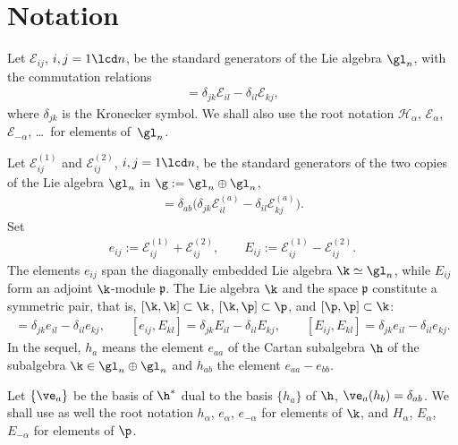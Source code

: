 \section{Notation}\label{section-notation}

Let ${\mathcal{E}}_{ij}$, $i,j=1\lcd n$, be the standard generators of the Lie algebra $\gl_n$, with the commutation relations
\begin{gather*}
[{\mathcal{E}}_{ij},{\mathcal{E}}_{kl}]=\delta_{jk}{\mathcal{E}}_{il}-\delta_{il}{\mathcal{E}}_{kj} ,
\end{gather*}
where $\delta_{jk}$ is the Kronecker symbol. We shall also use the root notation ${\mathcal{H}}_\alpha$, ${\mathcal{E}}_{\alpha}$, ${\mathcal{E}}_{-\alpha}$, \dots\ for elements of~$\gl_n$.


Let ${\mathcal{E}}_{ij}^{(1)}$ and ${\mathcal{E}}_{ij}^{(2)}$, $i,j=1\lcd n$, be the standard generators of the two copies of the Lie algebra $\gl_n$ in $\g:=\gl_n\oplus\gl_n$,
\begin{gather*}
[{\mathcal{E}}_{ij}^{(a)},{\mathcal{E}}_{kl}^{(b)}]=\delta_{ab}\big(\delta_{jk}{\mathcal{E}}_{il}^{(a)}-\delta_{il}{\mathcal{E}}_{kj}^{(a)}\big) .\end{gather*}
Set
\begin{gather*}
 e_{ij}:={\mathcal{E}}_{ij}^{(1)}+{\mathcal{E}}_{ij}^{(2)} ,\qquad E_{ij}:={\mathcal{E}}_{ij}^{(1)}-{\mathcal{E}}_{ij}^{(2)}
 .
 \end{gather*}
The elements $e_{ij}$ span the diagonally embedded Lie algebra $\k\simeq\gl_n$, while $E_{ij}$ form an adjoint $\k$-module $\mathfrak{p}$. The
Lie algebra $\k$ and the space $\mathfrak{p}$ constitute a symmetric pair, that is, $[\k,\k]\subset \k$, $[\k,\p]\subset \p$, and $[\p,\p]\subset \k$:
\begin{gather*}
 [e_{ij},e_{kl}] = \delta_{jk}e_{il}-\delta_{il}e_{kj}  ,\qquad
  [e_{ij},E_{kl}] = \delta_{jk}E_{il}-\delta_{il}E_{kj}  ,\qquad
   [E_{ij},E_{kl}] = \delta_{jk}e_{il}-\delta_{il}e_{kj} .
\end{gather*}
In the sequel, $h_a$ means the element $e_{aa}$ of the Cartan subalgebra $\h$ of the subalgebra $\k\in\gl_n\oplus\gl_n$ and $h_{ab}$ the
element $e_{aa}-e_{bb}$.


Let $\{\ve_a\}$ be the basis of $\h^*$ dual to the basis $\{ h_a\}$ of $\h$, $\ve_a(h_b)=\delta_{ab}$. We shall use as well the root notation $h_\alpha$,
$e_{\alpha}$, $e_{-\alpha}$ for elements of $\k$, and $H_\alpha$, $E_{\alpha}$, $E_{-\alpha}$ for elements of $\p$.


